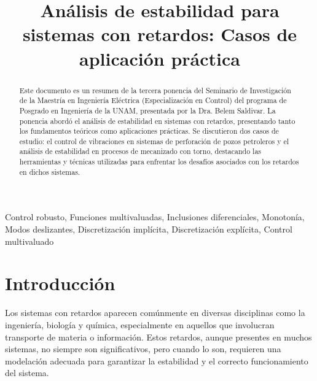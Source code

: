 \documentclass[conference]{IEEEtran}
\begin{document}
\title{Análisis de estabilidad para sistemas con retardos: Casos de aplicación práctica\\
}

\author{
	\and
}

\maketitle

\begin{abstract}
	Este documento es un resumen de la tercera ponencia del Seminario de Investigación de la Maestría en Ingeniería Eléctrica (Especialización en Control) del programa de Posgrado en Ingeniería de la UNAM, presentada por la Dra. Belem Saldivar. La ponencia abordó el análisis de estabilidad en sistemas con retardos, presentando tanto los fundamentos teóricos como aplicaciones prácticas. Se discutieron dos casos de estudio: el control de vibraciones en sistemas de perforación de pozos petroleros y el análisis de estabilidad en procesos de mecanizado con torno, destacando las herramientas y técnicas utilizadas para enfrentar los desafíos asociados con los retardos en dichos sistemas.
\end{abstract}

\begin{IEEEkeywords}
	Control robusto, Funciones multivaluadas, Inclusiones diferenciales, Monotonía, Modos deslizantes, Discretización implícita, Discretización explícita, Control multivaluado
\end{IEEEkeywords}


\section{Introducción}

Los sistemas con retardos aparecen comúnmente en diversas disciplinas como la ingeniería, biología y química, especialmente en aquellos que involucran transporte de materia o información. Estos retardos, aunque presentes en muchos sistemas, no siempre son significativos, pero cuando lo son, requieren una modelación adecuada para garantizar la estabilidad y el correcto funcionamiento del sistema.
\end{document}
